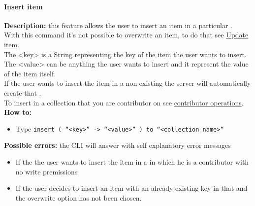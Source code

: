 \documentclass{scalatekids-article}
\begin{document}
\paragraph{Insert item}
\label{sec:insertitem}
\textbf{Description:} this feature allows the user to insert an item in a particular .\\
With this command it's not possible to overwrite an item, to do that see \hyperref[sec:updateditem]{Update item}.\\
The <key> is a String representing the key of the item the user wants to insert.\\
The <value> can be anything the user wants to insert and it represent the value of the item itself.\\
If the user wants to insert the item in a non existing  the server
will automatically create that .\\
To insert in a collection that you are contributor on see \hyperref[sec:contributoroperations]{contributor operations}.\\
\textbf{How to:}
\begin{itemize}
\item Type \texttt{insert ( ``<key>'' -> ``<value>'' ) to ``<collection name>''}
\end{itemize}
\textbf{Possible errors:} the CLI will answer with self explanatory error messages
\begin{itemize}
\item If the  the user wants to insert the item in a  in which he is a contributor with no write premissions
\item If the user decides to insert an item with an already existing key in that  and the overwrite option has not been chosen.
\end{itemize}
\end{document}
